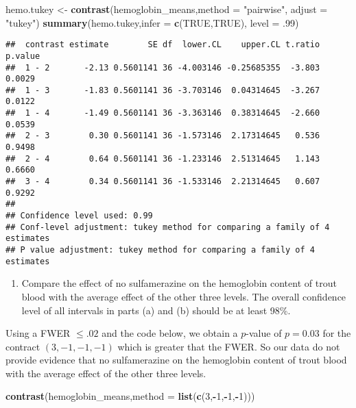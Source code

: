 \documentclass[12pt,]{article}
\newenvironment{Shaded}{\begin{snugshade}}{\end{snugshade}}
\newcommand{\KeywordTok}[1]{\textcolor[rgb]{0.13,0.29,0.53}{\textbf{#1}}}
\newcommand{\DataTypeTok}[1]{\textcolor[rgb]{0.13,0.29,0.53}{#1}}
\newcommand{\DecValTok}[1]{\textcolor[rgb]{0.00,0.00,0.81}{#1}}
\newcommand{\StringTok}[1]{\textcolor[rgb]{0.31,0.60,0.02}{#1}}
\newcommand{\OtherTok}[1]{\textcolor[rgb]{0.56,0.35,0.01}{#1}}
\newcommand{\OperatorTok}[1]{\textcolor[rgb]{0.81,0.36,0.00}{\textbf{#1}}}
\newcommand{\NormalTok}[1]{#1}
\providecommand{\tightlist}{%
  \setlength{\itemsep}{0pt}\setlength{\parskip}{0pt}}
\begin{document}
\begin{Shaded}
\begin{Highlighting}[]
\NormalTok{hemo.tukey <-}\StringTok{ }\KeywordTok{contrast}\NormalTok{(hemoglobin_means,}\DataTypeTok{method =} \StringTok{"pairwise"}\NormalTok{, }\DataTypeTok{adjust =} \StringTok{"tukey"}\NormalTok{)}
\KeywordTok{summary}\NormalTok{(hemo.tukey,}\DataTypeTok{infer =} \KeywordTok{c}\NormalTok{(}\OtherTok{TRUE}\NormalTok{,}\OtherTok{TRUE}\NormalTok{), }\DataTypeTok{level =}\NormalTok{ .}\DecValTok{99}\NormalTok{)}
\end{Highlighting}
\end{Shaded}

\begin{verbatim}
##  contrast estimate        SE df  lower.CL    upper.CL t.ratio p.value
##  1 - 2       -2.13 0.5601141 36 -4.003146 -0.25685355  -3.803  0.0029
##  1 - 3       -1.83 0.5601141 36 -3.703146  0.04314645  -3.267  0.0122
##  1 - 4       -1.49 0.5601141 36 -3.363146  0.38314645  -2.660  0.0539
##  2 - 3        0.30 0.5601141 36 -1.573146  2.17314645   0.536  0.9498
##  2 - 4        0.64 0.5601141 36 -1.233146  2.51314645   1.143  0.6660
##  3 - 4        0.34 0.5601141 36 -1.533146  2.21314645   0.607  0.9292
## 
## Confidence level used: 0.99 
## Conf-level adjustment: tukey method for comparing a family of 4 estimates 
## P value adjustment: tukey method for comparing a family of 4 estimates
\end{verbatim}

\begin{enumerate}
\def\labelenumi{(\alph{enumi})}
\setcounter{enumi}{1}
\tightlist
\item
  Compare the effect of no sulfamerazine on the hemoglobin content of
  trout blood with the average effect of the other three levels. The
  overall confidence level of all intervals in parts (a) and (b) should
  be at least 98\%.
\end{enumerate}

Using a FWER \(\leq .02\) and the code below, we obtain a \(p\)-value of
\(p=0.03\) for the contract \((3,-1,-1,-1)\) which is greater that the
FWER. So our data do not provide evidence that no sulfamerazine on the
hemoglobin content of trout blood with the average effect of the other
three levels.

\begin{Shaded}
\begin{Highlighting}[]
\KeywordTok{contrast}\NormalTok{(hemoglobin_means,}\DataTypeTok{method =} \KeywordTok{list}\NormalTok{(}\KeywordTok{c}\NormalTok{(}\DecValTok{3}\NormalTok{,}\OperatorTok{-}\DecValTok{1}\NormalTok{,}\OperatorTok{-}\DecValTok{1}\NormalTok{,}\OperatorTok{-}\DecValTok{1}\NormalTok{)))}
\end{Highlighting}
\end{Shaded}
\end{document}
